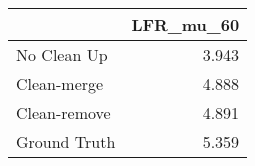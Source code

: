 \begin{tabular}{lr}
\toprule
{} & LFR_mu_60 \\
\midrule
No Clean Up  &     3.943 \\
Clean-merge  &     4.888 \\
Clean-remove &     4.891 \\
Ground Truth &     5.359 \\
\bottomrule
\end{tabular}
